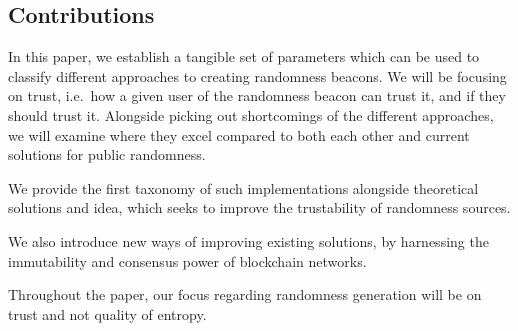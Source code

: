 \subsection*{Contributions}\label{subsec:contributions}
In this paper, we establish a tangible set of parameters which can be used to classify different approaches to creating randomness beacons. We will be focusing on trust, i.e.\ how a given user of the randomness beacon can trust it, and if they should trust it.
Alongside picking out shortcomings of the different approaches, we will examine where they excel compared to both each other and current solutions for public randomness.

We provide the first taxonomy of such implementations alongside theoretical solutions and idea, which seeks to improve the trustability of randomness sources.

We also introduce new ways of improving existing solutions, by harnessing the immutability and consensus power of blockchain networks.

Throughout the paper, our focus regarding randomness generation will be on trust and not quality of entropy.







